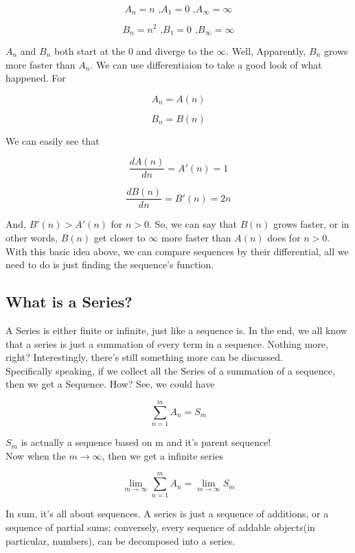 \documentclass{article}
\begin{document}
  \[
	  A_n = n \text{ ,} A_1 = 0 \text{ ,} A_\infty = \infty
  \]

  \[
	  B_n = n^2 \text{ ,} B_1 = 0 \text{ ,} B_\infty = \infty
  \]

  $A_n$ and $B_n$ both start at the $0$ and diverge to the $\infty$. Well, Apparently, $B_n$ grows more faster than $A_n$. We can use differentiaion to take a good look of what happened. For

  \[
	  A_n = A(n)
  \]

  \[
	  B_n = B(n)
  \]

  We can easily see that 
  
  \[
	  \dfrac{dA(n)}{dn} = A'(n) = 1
  \]

  \[
	  \dfrac{dB(n)}{dn} = B'(n) = 2n
  \]

  And, $B'(n)>A'(n)$ for $n>0$. So, we can say that $B(n)$ grows faster, or in other words, $B(n)$ get closer to $\infty$ more faster than $A(n)$ does for $n>0$. \\

  With this basic idea above, we can compare sequences by their differential, all we need to do is just finding the sequence's function.

  \subsection{What is a Series?}
  A Series is either finite or infinite, just like a sequence is. In the end, we all know that a series is just a summation of every term in a sequence. Nothing more, right? Interestingly, there's still something more can be discussed. \\

  Specifically speaking, if we collect all the Series of a summation of a sequence, then we get a Sequence. How? See, we could have

  \[
	  \sum_{n=1}^{m} A_n = S_m
  \]

  $S_m$ is actually a sequence based on m and it's parent sequence! \\

  Now when the $m \to \infty$, then we get a infinite series

  \[
	  \lim_{m \to \infty} \sum_{n=1}^{m} A_n = \lim_{m \to \infty} S_m
  \]

  In sum, it's all about sequences. A series is just a sequence of additions, or a sequence of partial sums; conversely, every sequence of addable objects(in particular, numbers), can be decomposed into a series.
\end{document}
